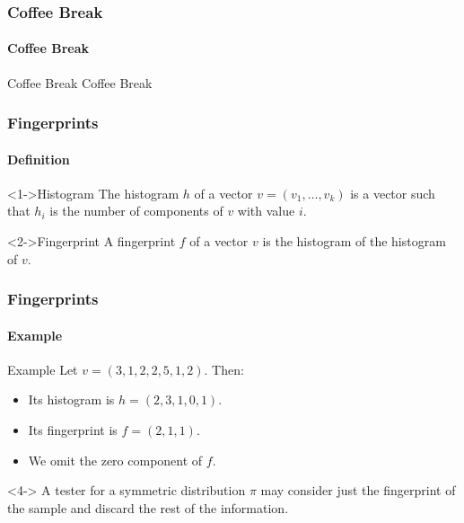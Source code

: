 \documentclass{beamer}
\begin{document}
\begin{frame}
  \frametitle{Coffee Break}
  \framesubtitle{Coffee Break}
  \begin{block}{Coffee Break}
    Coffee Break
  \end{block}
\end{frame}

\begin{frame}
  \frametitle{Fingerprints} \framesubtitle{Definition}

  \begin{block}<1->{Histogram}
    The histogram $h$ of a vector $v=(v_1,\ldots,v_k)$ is a vector such
    that $h_i$ is the number of components of $v$ with value $i$.
  \end{block}
  \begin{block}<2->{Fingerprint}
    A fingerprint $f$ of a vector $v$ is the histogram of the
    histogram of $v$.
  \end{block}
\end{frame}

\begin{frame}
  \frametitle{Fingerprints} \framesubtitle{Example}

  \begin{block}{Example}
    Let $v=(3,1,2,2,5,1,2)$. Then:
    \begin{itemize}
    \item<1-> Its histogram is $h=(2,3,1,0,1)$.
    \item<2-> Its fingerprint is $f=(2,1,1)$.
    \item<3-> We omit the zero component of $f$.
    \end{itemize}
  \end{block}
  \begin{block}<4->{} A tester for a symmetric distribution $\pi$ may
    consider just the fingerprint of the sample and discard the rest
    of the information.
  \end{block}
\end{frame}
\end{document}
